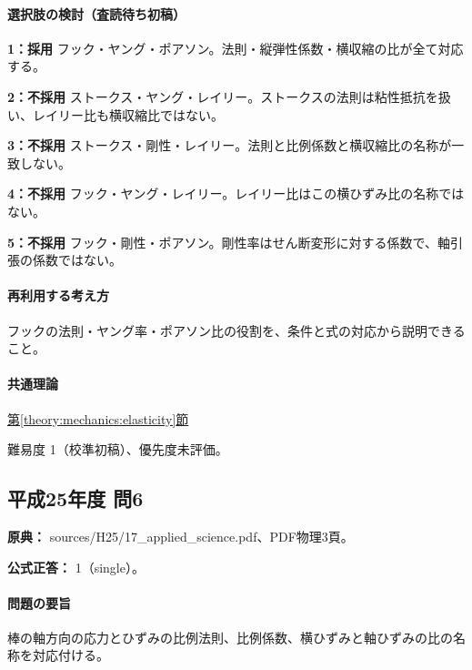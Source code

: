 \paragraph{選択肢の検討（査読待ち初稿）}\mbox{}\par

\noindent\textbf{1：採用} フック・ヤング・ポアソン。法則・縦弾性係数・横収縮の比が全て対応する。\par

\noindent\textbf{2：不採用} ストークス・ヤング・レイリー。ストークスの法則は粘性抵抗を扱い、レイリー比も横収縮比ではない。\par

\noindent\textbf{3：不採用} ストークス・剛性・レイリー。法則と比例係数と横収縮比の名称が一致しない。\par

\noindent\textbf{4：不採用} フック・ヤング・レイリー。レイリー比はこの横ひずみ比の名称ではない。\par

\noindent\textbf{5：不採用} フック・剛性・ポアソン。剛性率はせん断変形に対する係数で、軸引張の係数ではない。\par

\paragraph{再利用する考え方} フックの法則・ヤング率・ポアソン比の役割を、条件と式の対応から説明できること。

\paragraph{共通理論} \hyperref[theory:mechanics:elasticity]{第\ref*{theory:mechanics:elasticity}節}

\par 難易度 1（校準初稿）、優先度未評価。

\subsection{平成25年度 問6}
\label{q:h25-reg-applied-06}

\noindent\textbf{原典：} sources/H25/17\_applied\_science.pdf、PDF物理3頁。

\textbf{公式正答：} 1（single）。

\paragraph{問題の要旨} 棒の軸方向の応力とひずみの比例法則、比例係数、横ひずみと軸ひずみの比の名称を対応付ける。


